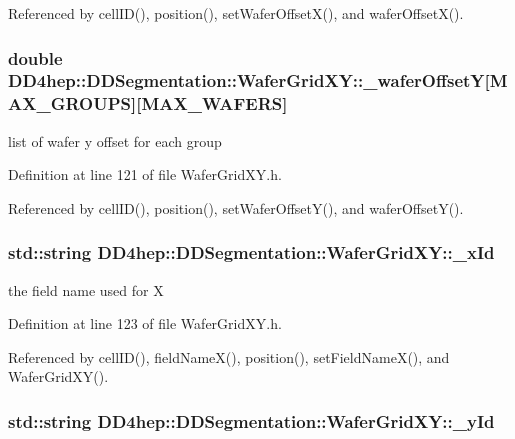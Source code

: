 Referenced by cellID(), position(), setWaferOffsetX(), and waferOffsetX().\hypertarget{class_d_d4hep_1_1_d_d_segmentation_1_1_wafer_grid_x_y_a247bd183dfa82726c4d455d4e814622f}{
\subsubsection[{\_\-waferOffsetY}]{\setlength{\rightskip}{0pt plus 5cm}double {\bf DD4hep::DDSegmentation::WaferGridXY::\_\-waferOffsetY}\mbox{[}MAX\_\-GROUPS\mbox{]}\mbox{[}MAX\_\-WAFERS\mbox{]}}}
\label{class_d_d4hep_1_1_d_d_segmentation_1_1_wafer_grid_x_y_a247bd183dfa82726c4d455d4e814622f}


list of wafer y offset for each group 

Definition at line 121 of file WaferGridXY.h.

Referenced by cellID(), position(), setWaferOffsetY(), and waferOffsetY().\hypertarget{class_d_d4hep_1_1_d_d_segmentation_1_1_wafer_grid_x_y_ac90f589f06ac860a0015e6a5e46b081b}{
\subsubsection[{\_\-xId}]{\setlength{\rightskip}{0pt plus 5cm}std::string {\bf DD4hep::DDSegmentation::WaferGridXY::\_\-xId}}}
\label{class_d_d4hep_1_1_d_d_segmentation_1_1_wafer_grid_x_y_ac90f589f06ac860a0015e6a5e46b081b}


the field name used for X 

Definition at line 123 of file WaferGridXY.h.

Referenced by cellID(), fieldNameX(), position(), setFieldNameX(), and WaferGridXY().\hypertarget{class_d_d4hep_1_1_d_d_segmentation_1_1_wafer_grid_x_y_ac81f2246c4f13a9299036aab012d5887}{
\subsubsection[{\_\-yId}]{\setlength{\rightskip}{0pt plus 5cm}std::string {\bf DD4hep::DDSegmentation::WaferGridXY::\_\-yId}}}
\label{class_d_d4hep_1_1_d_d_segmentation_1_1_wafer_grid_x_y_ac81f2246c4f13a9299036aab012d5887}


